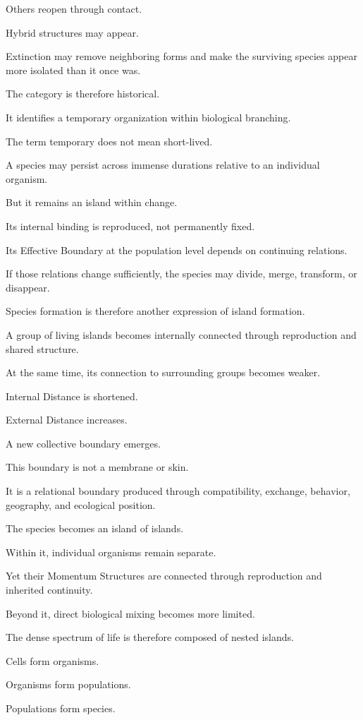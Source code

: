 Others reopen through contact.

Hybrid structures may appear.

Extinction may remove neighboring forms and make the surviving species appear more isolated than it once was.

The category is therefore historical.

It identifies a temporary organization within biological branching.

The term temporary does not mean short-lived.

A species may persist across immense durations relative to an individual organism.

But it remains an island within change.

Its internal binding is reproduced, not permanently fixed.

Its Effective Boundary at the population level depends on continuing relations.

If those relations change sufficiently, the species may divide, merge, transform, or disappear.

Species formation is therefore another expression of island formation.

A group of living islands becomes internally connected through reproduction and shared structure.

At the same time, its connection to surrounding groups becomes weaker.

Internal Distance is shortened.

External Distance increases.

A new collective boundary emerges.

This boundary is not a membrane or skin.

It is a relational boundary produced through compatibility, exchange, behavior, geography, and ecological position.

The species becomes an island of islands.

Within it, individual organisms remain separate.

Yet their Momentum Structures are connected through reproduction and inherited continuity.

Beyond it, direct biological mixing becomes more limited.

The dense spectrum of life is therefore composed of nested islands.

Cells form organisms.

Organisms form populations.

Populations form species.

